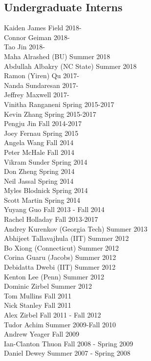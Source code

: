 \subsection{Undergraduate Interns}
\noindent
Kaiden James Field \hfill 2018-\\
Connor Geiman \hfill 2018-\\
Tao Jin \hfill 2018-\\
Maha Alrashed (BU) \hfill Summer 2018\\
Abdullah Albakry (NC State) \hfill Summer 2018\\
Ramon (Yiren) Qu \hfill 2017-\\
Nanda Sundaresan \hfill 2017-\\
Jeffrey Maxwell \hfill 2017-\\
Vinitha Ranganeni \hfill Spring 2015-2017\\
Kevin Zhang  \hfill Spring 2015-2017\\
Pengju Jin  \hfill Fall 2014-2017\\
Joey Fernau  \hfill Spring 2015\\
Angela Wang  \hfill Fall 2014\\
Peter McHale  \hfill Fall 2014\\
Vikram Sunder  \hfill Spring 2014\\
Don Zheng  \hfill Spring 2014\\
Neil Jassal  \hfill Spring 2014\\
Myles Blodnick  \hfill Spring 2014\\
Scott Martin  \hfill Spring 2014\\
Yuyang Guo  \hfill Fall 2013 - Fall 2014\\
Rachel Holladay  \hfill Fall 2013-2017\\
Andrey Kurenkov (Georgia Tech) \hfill Summer 2013\\ 
Abhijeet Tallavajhula (IIT) \hfill Summer 2012\\
Bo Xiong (Connecticut) \hfill Summer 2012\\
Corina Guaru (Jacobs) \hfill Summer 2012\\
Debidatta Dwebi (IIT) \hfill Summer 2012\\
Kenton Lee (Penn) \hfill Summer 2012\\
Dominic Zirbel  \hfill Summer 2012\\
Tom Mullins  \hfill Fall 2011\\
Nick Stanley  \hfill Fall 2011\\
Alex Zirbel  \hfill Fall 2011 - Fall 2012\\
Tudor Achim  \hfill Summer 2009-Fall 2010\\
Andrew Yeager  \hfill Fall 2009\\
Ian-Clanton Thuon  \hfill Fall 2008 - Spring 2009\\
Daniel Dewey  \hfill Summer 2007 - Spring 2008\\

